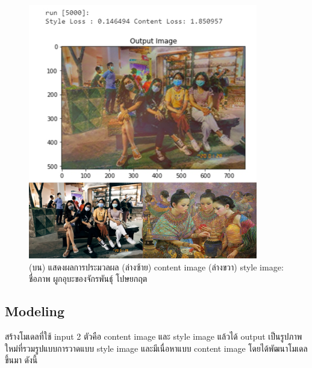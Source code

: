 \documentclass[12pt,oneside,openright,a4paper]{cpe-thai-project}
\begin{document}
\newpage
\begin{figure}[!h]
  \centering
  \includegraphics[width=10cm]{./image/result2.png}
  \caption{(บน) แสดงผลการประมวลผล (ล่างซ้าย) content image (ล่างขวา) style image: ชื่อภาพ ผูกอุบะของจักรพันธุ์ โปษยกฤต}
  \label{fig:result2}
\end{figure}

\subsection{Modeling}
\par\setlength{\parindent}{5ex}
สร้างโมเดลที่ใช้ input 2 ตัวคือ content image และ style image แล้วได้ output เป็นรูปภาพใหม่ที่รวมรูปแบบการวาดแบบ style image และมีเนื่อหาแบบ content image โดยได้พัฒนาโมเดลขึ้นมา ดังนี้
\end{document}
